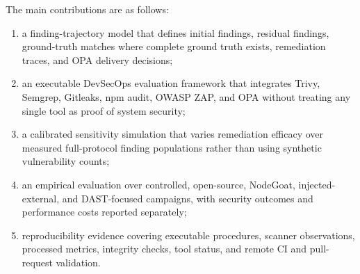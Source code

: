 The main contributions are as follows:
\begin{enumerate}
\item a finding-trajectory model that defines initial findings, residual findings, ground-truth matches where complete ground truth exists, remediation traces, and OPA delivery decisions;
\item an executable DevSecOps evaluation framework that integrates Trivy, Semgrep, Gitleaks, npm audit, OWASP ZAP, and OPA without treating any single tool as proof of system security;
\item a calibrated sensitivity simulation that varies remediation efficacy over measured full-protocol finding populations rather than using synthetic vulnerability counts;
\item an empirical evaluation over controlled, open-source, NodeGoat, injected-external, and DAST-focused campaigns, with security outcomes and performance costs reported separately;
\item reproducibility evidence covering executable procedures, scanner observations, processed metrics, integrity checks, tool status, and remote CI and pull-request validation.
\end{enumerate}
